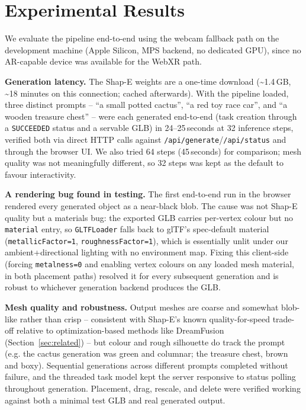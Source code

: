\documentclass[sigconf,nonacm]{acmart}
\begin{document}
\section{Experimental Results}
We evaluate the pipeline end-to-end using the webcam fallback path on the
development machine (Apple Silicon, MPS backend, no dedicated GPU), since
no AR-capable device was available for the WebXR path.

\textbf{Generation latency.} The Shap-E weights are a one-time download
(\textasciitilde{}1.4\,GB, \textasciitilde{}18 minutes on this
connection; cached afterwards). With the pipeline loaded, three distinct
prompts -- ``a small potted cactus'', ``a red toy race car'', and ``a
wooden treasure chest'' -- were each generated end-to-end (task creation
through a \texttt{SUCCEEDED} status and a servable GLB) in
24--25\,seconds at 32 inference steps, verified both via direct HTTP
calls against \texttt{/api/generate}/\texttt{/api/status} and through the
browser UI. We also tried 64 steps (45\,seconds) for comparison; mesh
quality was not meaningfully different, so 32 steps was kept as the
default to favour interactivity.

\textbf{A rendering bug found in testing.} The first end-to-end run in
the browser rendered every generated object as a near-black blob. The
cause was not Shap-E quality but a materials bug: the exported GLB
carries per-vertex colour but no \texttt{material} entry, so
\texttt{GLTFLoader} falls back to glTF's spec-default material
(\texttt{metallicFactor=1}, \texttt{roughnessFactor=1}), which is
essentially unlit under our ambient+directional lighting with no
environment map. Fixing this client-side (forcing \texttt{metalness=0}
and enabling vertex colours on any loaded mesh material, in both
placement paths) resolved it for every subsequent generation and is
robust to whichever generation backend produces the GLB.


\textbf{Mesh quality and robustness.} Output meshes are coarse and
somewhat blob-like rather than crisp -- consistent with Shap-E's known
quality-for-speed trade-off relative to optimization-based methods like
DreamFusion (Section~\ref{sec:related}) -- but colour and rough silhouette do track the
prompt (e.g. the cactus generation was green and columnar; the treasure
chest, brown and boxy). Sequential generations across different prompts
completed without failure, and the threaded task model kept the server
responsive to status polling throughout generation. Placement, drag,
rescale, and delete were verified working against both a minimal test
GLB and real generated output.
\end{document}
